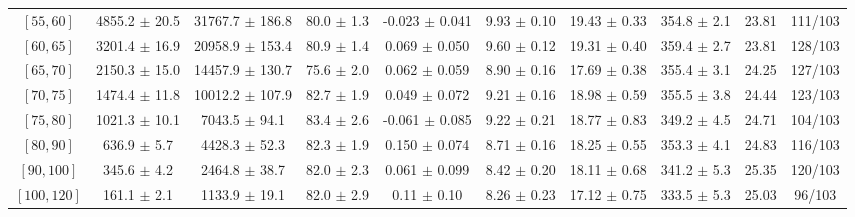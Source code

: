 \begin{tabular}{c||c|c|c|c|c|c|c||c|c}
$[55, 60]$ & 4855.2 $\pm$ 20.5 & 31767.7 $\pm$ 186.8 & 80.0 $\pm$ 1.3 & -0.023 $\pm$ 0.041 & 9.93 $\pm$ 0.10 & 19.43 $\pm$ 0.33 & 354.8 $\pm$ 2.1 & 23.81 & 111/103\\
$[60, 65]$ & 3201.4 $\pm$ 16.9 & 20958.9 $\pm$ 153.4 & 80.9 $\pm$ 1.4 & 0.069 $\pm$ 0.050 & 9.60 $\pm$ 0.12 & 19.31 $\pm$ 0.40 & 359.4 $\pm$ 2.7 & 23.81 & 128/103\\
$[65, 70]$ & 2150.3 $\pm$ 15.0 & 14457.9 $\pm$ 130.7 & 75.6 $\pm$ 2.0 & 0.062 $\pm$ 0.059 & 8.90 $\pm$ 0.16 & 17.69 $\pm$ 0.38 & 355.4 $\pm$ 3.1 & 24.25 & 127/103\\
$[70, 75]$ & 1474.4 $\pm$ 11.8 & 10012.2 $\pm$ 107.9 & 82.7 $\pm$ 1.9 & 0.049 $\pm$ 0.072 & 9.21 $\pm$ 0.16 & 18.98 $\pm$ 0.59 & 355.5 $\pm$ 3.8 & 24.44 & 123/103\\
$[75, 80]$ & 1021.3 $\pm$ 10.1 & 7043.5 $\pm$ 94.1 & 83.4 $\pm$ 2.6 & -0.061 $\pm$ 0.085 & 9.22 $\pm$ 0.21 & 18.77 $\pm$ 0.83 & 349.2 $\pm$ 4.5 & 24.71 & 104/103\\
$[80, 90]$ & 636.9 $\pm$ 5.7 & 4428.3 $\pm$ 52.3 & 82.3 $\pm$ 1.9 & 0.150 $\pm$ 0.074 & 8.71 $\pm$ 0.16 & 18.25 $\pm$ 0.55 & 353.3 $\pm$ 4.1 & 24.83 & 116/103\\
$[90, 100]$ & 345.6 $\pm$ 4.2 & 2464.8 $\pm$ 38.7 & 82.0 $\pm$ 2.3 & 0.061 $\pm$ 0.099 & 8.42 $\pm$ 0.20 & 18.11 $\pm$ 0.68 & 341.2 $\pm$ 5.3 & 25.35 & 120/103\\
$[100, 120]$ & 161.1 $\pm$ 2.1 & 1133.9 $\pm$ 19.1 & 82.0 $\pm$ 2.9 & 0.11 $\pm$ 0.10 & 8.26 $\pm$ 0.23 & 17.12 $\pm$ 0.75 & 333.5 $\pm$ 5.3 & 25.03 & 96/103\\
\end{tabular}
